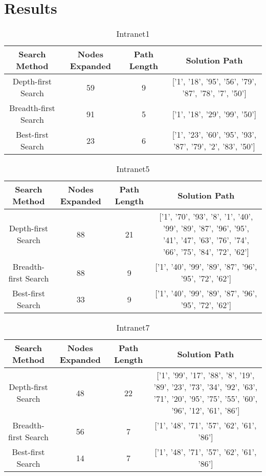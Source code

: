 \documentclass[12pt]{article}
\begin{document}
\section{Results}
\begin{table}[h]
\caption{Intranet1} \label{tab:title} 
\begin{center}
 \begin{tabular}{|c| c |c |c|} 
 \hline
 Search Method & Nodes Expanded & Path Length & Solution Path \\ [0.5ex] 
 \hline
 Depth-first Search & 59 & 9 & \multicolumn{1}{m{3cm}|}{['1', '18', '95', '56', '79', '87', '78', '7', '50']}\\ 
 \hline
 Breadth-first Search & 91 & 5 & \multicolumn{1}{m{3cm}|}{['1', '18', '29', '99', '50']}\\
 \hline
 Best-first Search & 23 & 6 & \multicolumn{1}{m{3cm}|}{['1', '23', '60', '95', '93', '87', '79', '2', '83', '50']}\\[1ex] 
 \hline
\end{tabular}
\end{center}
\end{table}
\begin{table}[h]
\caption{Intranet5} \label{tab:title} 
\begin{center}
 \begin{tabular}{|c| c |c |c|} 
 \hline
 Search Method & Nodes Expanded & Path Length& Solution Path \\ [0.5ex] 
 \hline
 Depth-first Search & 88 & 21& \multicolumn{1}{m{3cm}|}{['1', '70', '93', '8', '1', '40', '99', '89', '87', '96', '95', '41', '47', '63', '76', '74', '66', '75', '84', '72', '62']}\\ 
 \hline
 Breadth-first Search & 88 & 9& \multicolumn{1}{m{3cm}|}{['1', '40', '99', '89', '87', '96', '95', '72', '62']}\\
 \hline
 Best-first Search & 33 & 9& \multicolumn{1}{m{3cm}|}{['1', '40', '99', '89', '87', '96', '95', '72', '62']}\\[1ex] 
 \hline
\end{tabular}
\end{center}
\end{table}
\begin{table}[h]
\caption{Intranet7} \label{tab:title} 
\begin{center}
 \begin{tabular}{|c| c | c | c|} 
 \hline
 Search Method & Nodes Expanded & Path Length&Solution Path \\ [0.5ex] 
 \hline
 Depth-first Search & 48 & 22&\multicolumn{1}{m{3cm}|}{['1', '99', '17', '88', '8', '19', '89', '23', '73', '34', '92', '63', '71', '20', '95', '75', '55', '60', '96', '12', '61', '86']}\\ 
 \hline
 Breadth-first Search & 56 & 7&\multicolumn{1}{m{3cm}|}{
['1', '48', '71', '57', '62', '61', '86']}\\
 \hline
 Best-first Search & 14 & 7&\multicolumn{1}{m{3cm}|}{['1', '48', '71', '57', '62', '61', '86']}\\[1ex] 
 \hline
\end{tabular}
\end{center}
\end{table}
\end{document}
